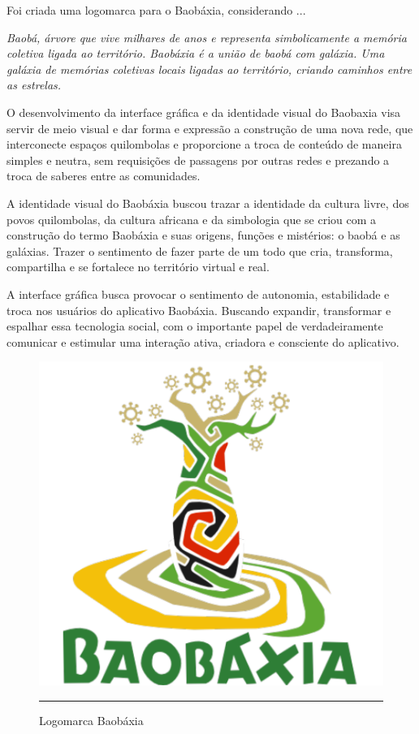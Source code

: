 Foi criada uma logomarca para o Baobáxia, considerando ...

\emph{Baobá, árvore que vive milhares de anos e representa simbolicamente
a memória coletiva ligada ao território. Baobáxia é a união de baobá com
galáxia. Uma galáxia de memórias coletivas locais ligadas ao território,
criando caminhos entre as estrelas.}

O desenvolvimento da interface gráfica e da identidade visual do Baobaxia
visa servir de meio visual e dar forma e expressão a construção de uma
nova rede, que interconecte espaços quilombolas e proporcione a troca de
conteúdo de maneira simples e neutra, sem requisições de passagens por
outras redes e prezando a troca de saberes entre as comunidades.

A identidade visual do Baobáxia buscou trazar a identidade da cultura livre,
dos povos quilombolas, da cultura africana e da simbologia que se criou com
a construção do termo Baobáxia e suas origens, funções e mistérios: o baobá
e as galáxias. Trazer o sentimento de fazer parte de um todo que cria,
transforma, compartilha e se fortalece no território virtual e real.

A interface gráfica busca provocar o sentimento de autonomia, estabilidade
e troca nos usuários do aplicativo Baobáxia. Buscando expandir, transformar
e espalhar essa tecnologia social, com o importante papel de verdadeiramente
comunicar e estimular uma interação ativa, criadora e consciente do
aplicativo. 

\begin{figure}[htbp]
  \centering
  \includegraphics[width=\textwidth]{./Fig/Logo_BBX.pdf}
  \rule{35em}{0.5pt}
  \caption[Logomarca Baobáxia]{Logomarca Baobáxia}
  \label{fig:Logo_BBX}
\end{figure}


